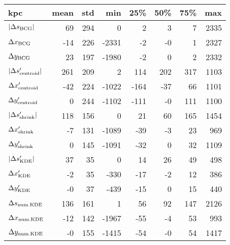 \begin{tabular}{lrrrrrrr}
\toprule
kpc &  mean &  std &   min &  25\% &  50\% &  75\% &  max \\
\midrule
$|\Delta s_{\rm BCG}|$       &    69 &  294 &     0 &    2 &    3 &    7 & 2335 \\
$\Delta x_{\rm BCG}$         &   -14 &  226 & -2331 &   -2 &   -0 &    1 & 2327 \\
$\Delta y_{\rm BCG}$         &    23 &  197 & -1980 &   -2 &    0 &    2 & 2332 \\
$|\Delta s_{\rm centroid}'|$ &   261 &  209 &     2 &  114 &  202 &  317 & 1103 \\
$\Delta x_{\rm centroid}'$   &   -42 &  224 & -1022 & -164 &  -37 &   66 & 1101 \\
$\Delta y_{\rm centroid}'$   &     0 &  244 & -1102 & -111 &   -0 &  111 & 1100 \\
$|\Delta s_{\rm shrink}'|$   &   118 &  156 &     0 &   21 &   60 &  165 & 1454 \\
$\Delta x_{\rm shrink}'$     &    -7 &  131 & -1089 &  -39 &   -3 &   23 &  969 \\
$\Delta y_{\rm shrink}'$     &     0 &  145 & -1091 &  -32 &    0 &   32 & 1109 \\
$|\Delta s_{\rm KDE}'|$      &    37 &   35 &     0 &   14 &   26 &   49 &  498 \\
$\Delta x_{\rm KDE}'$        &    -2 &   35 &  -330 &  -17 &   -2 &   12 &  386 \\
$\Delta y_{\rm KDE}'$        &    -0 &   37 &  -439 &  -15 &    0 &   15 &  440 \\
$\Delta s_{\rm num. KDE}$    &   136 &  161 &     1 &   56 &   92 &  147 & 2126 \\
$\Delta x_{\rm num. KDE}$    &   -12 &  142 & -1967 &  -55 &   -4 &   53 &  993 \\
$\Delta y_{\rm num. KDE}$    &    -0 &  155 & -1415 &  -54 &   -0 &   54 & 1417 \\
\bottomrule
\end{tabular}
